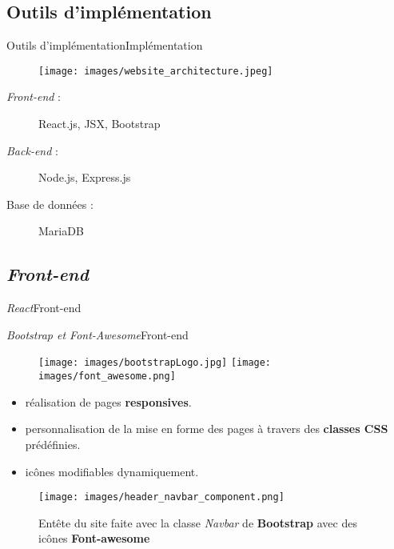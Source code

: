 \documentclass[usenames,dvipsnames]{beamer}
\begin{document}
\subsection{Outils d'implémentation}
\begin{frame}{Outils d'implémentation}{Implémentation}
  \begin{figure}[!ht]
    \centering
    \texttt{[image: images/website\_architecture.jpeg]}
  \end{figure}

  \begin{description}
    \item [\textit{Front-end} :] React.js, JSX, Bootstrap
    \item [\textit{Back-end} :] Node.js, Express.js
    \item [Base de données :] MariaDB
  \end{description}
\end{frame}
\subsection{\protect\textit{Front-end}}
\begin{frame}{\textit{React}}{Front-end}

\end{frame}
\begin{frame}{\textit{Bootstrap et Font-Awesome}}{Front-end}
  \begin{figure}[!ht]
    \texttt{[image: images/bootstrapLogo.jpg]}
    \hfill
    \texttt{[image: images/font\_awesome.png]}
  \end{figure}

  \begin{itemize}
    \item réalisation de pages \textbf{responsives}.
    \item personnalisation de la mise en forme des pages à travers des \textbf{classes CSS} prédéfinies.
    \item icônes modifiables dynamiquement.
  \end{itemize}

  \begin{figure}[!ht]
    \texttt{[image: images/header\_navbar\_component.png]}
    \caption{Entête du site faite avec la classe \textit{Navbar} de \textbf{Bootstrap} avec des icônes \textbf{Font-awesome}}
  \end{figure}
\end{frame}
\end{document}
